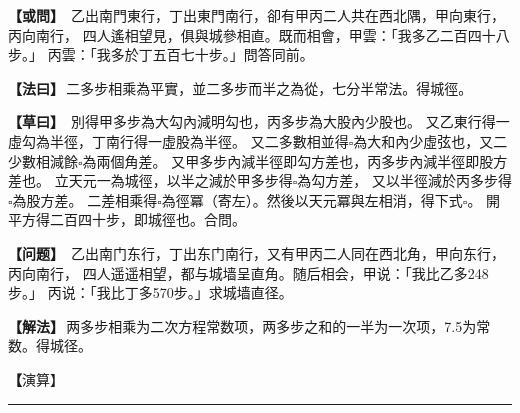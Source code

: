\documentclass[11pt,a4paper]{article}
\let\origsquare\square
\renewcommand{\square}{\ensuremath{\origsquare}}%
\newcommand{\longline}{\noindent\rule{\textwidth}{0.4pt}}
\newcommand{\clOWEN}[1]{%
  \par\vspace{0.3em}%
  \noindent\textcolor{problemcolor}{\textbf{【或問】}}\,{\tradfont #1}\par\nopagebreak%
}
\newcommand{\mdOWEN}[1]{%
  \par\vspace{0.3em}%
  \noindent\textcolor{problemcolor}{\textbf{【问题】}}\,{\modfont #1}\par\nopagebreak%
}
\newcommand{\clFAYUE}[1]{%
  \par\noindent\textcolor{methodcolor}{\textbf{【法曰】}}\,{\tradfont #1}\par\nopagebreak%
}
\newcommand{\mdFAYUE}[1]{%
  \par\noindent\textcolor{methodcolor}{\textbf{【解法】}}\,{\modfont #1}\par\nopagebreak%
}
\newcommand{\clTSAOYUE}[1]{%
  \par\noindent\textcolor{workcolor}{\textbf{【草曰】}}\,{\tradfont #1}\par%
}
\newcommand{\mdTSAOYUE}[1]{%
  \par\noindent\textcolor{workcolor}{\textbf【演算】}}\,{\modfont #1}\par%
\begin{document}
\begin{paracol}{2}

\begin{leftcolumn}
\clOWEN{%
乙出南門東行，丁出東門南行，卻有甲丙二人共在西北隅，甲向東行，丙向南行，
四人遙相望見，俱與城參相直。既而相會，甲雲：「我多乙二百四十八步。」
丙雲：「我多於丁五百七十步。」問答同前。}

\clFAYUE{二多步相乘為平實，並二多步而半之為從，七分半常法。得城徑。}

\clTSAOYUE{%
別得甲多步為大勾內減明勾也，丙多步為大股內少股也。
又乙東行得一虛勾為半徑，丁南行得一虛股為半徑。
又二多數相並得$\square$為大和內少虛弦也，又二少數相減餘$\square$為兩個角差。
又甲多步內減半徑即勾方差也，丙多步內減半徑即股方差也。
立天元一為城徑，以半之減於甲多步得$\square$為勾方差，
又以半徑減於丙多步得$\square$為股方差。
二差相乘得$\square$為徑冪（寄左）。然後以天元冪與左相消，得下式$\square$。
開平方得二百四十步，即城徑也。合問。}
\end{leftcolumn}

\switchcolumn

\begin{rightcolumn}
\mdOWEN{%
乙出南门东行，丁出东门南行，又有甲丙二人同在西北角，甲向东行，丙向南行，
四人遥遥相望，都与城墙呈直角。随后相会，甲说：「我比乙多248步。」
丙说：「我比丁多570步。」求城墙直径。}

\mdFAYUE{两多步相乘为二次方程常数项，两多步之和的一半为一次项，7.5为常数。得城径。}

\mdTSAOYUE{%
辨识得：甲多步为大勾减明勾，丙多步为大股减股。
乙东行得一虚勾为半径，丁南行得一虚股为半径。
两多数相加得$\square$为大和减去虚弦，两少数相减余$\square$为两个角差。
甲多步减去半半径即勾方差，丙多步减去半半径即股方差。
设天元一为城径，从甲多步中减去其一半得$\square$为勾方差，
再从丙多步中减去半半径得$\square$为股方差。
二差相乘得$\square$为径冪（寄左）。然后天元冪与左式相消，得下式$\square$。
开平方得240步，即城径。符合所问。}
\end{rightcolumn}

\end{paracol}

\vspace{0.3cm}
\begin{center}\longline\end{center}
\end{document}
